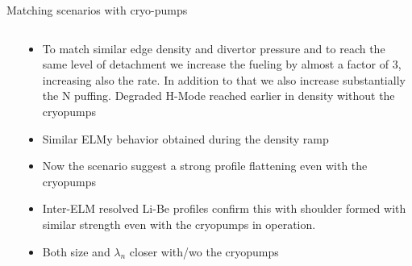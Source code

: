 \documentclass[10pt, compress]{beamer}
\newcommand\Fontvi{\fontsize{8}{7.2}\selectfont}
\begin{document}
\begin{frame}{Matching scenarios with cryo-pumps}
\Fontvi
  \vspace{-1cm}
\begin{columns}
  \begin{column}{0.65\textwidth}
  \end{column}
  \begin{column}{0.35\textwidth}
    \begin{itemize}
      \item<1|only@1> To match similar edge density and divertor pressure
        and to reach the same level of detachment we increase the
        fueling by almost a factor of 3, increasing also the rate. In
        addition to that we also increase substantially the N
        puffing. \alert{Degraded H-Mode reached earlier in density
          without the cryopumps}
      \item<2|only@2> Similar ELMy behavior obtained during the density ramp  
      \item<3|only@3> Now the scenario suggest a strong profile flattening
        even with the cryopumps
       \item<4|only@4> Inter-ELM resolved Li-Be profiles confirm this with
         shoulder formed with similar strength even with the cryopumps
         in operation.
         \item<5|only@5> Both size and $\lambda_n$ closer with/wo the cryopumps 
       \end{itemize}
  \end{column}
\end{columns}
\end{frame}
\end{document}

